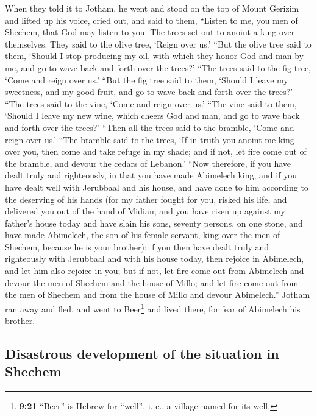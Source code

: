  When they told it to Jotham, he went and stood on the top
of Mount Gerizim and lifted up his voice, cried out, and said to them,
``Listen to me, you men of Shechem, that God may listen to you.
 The trees set out to anoint a king over themselves. They
said to the olive tree, `Reign over us.'  ``But the olive
tree said to them, `Should I stop producing my oil, with which they
honor God and man by me, and go to wave back and forth over the trees?'
 ``The trees said to the fig tree, `Come and reign over
us.'  ``But the fig tree said to them, `Should I leave my
sweetness, and my good fruit, and go to wave back and forth over the
trees?'  ``The trees said to the vine, `Come and reign
over us.'  ``The vine said to them, `Should I leave my
new wine, which cheers God and man, and go to wave back and forth over
the trees?'  ``Then all the trees said to the bramble,
`Come and reign over us.'  ``The bramble said to the
trees, `If in truth you anoint me king over you, then come and take
refuge in my shade; and if not, let fire come out of the bramble, and
devour the cedars of Lebanon.'  ``Now therefore, if you
have dealt truly and righteously, in that you have made Abimelech king,
and if you have dealt well with Jerubbaal and his house, and have done
to him according to the deserving of his hands  (for my
father fought for you, risked his life, and delivered you out of the
hand of Midian;  and you have risen up against my
father's house today and have slain his sons, seventy persons, on one
stone, and have made Abimelech, the son of his female servant, king over
the men of Shechem, because he is your brother);  if you
then have dealt truly and righteously with Jerubbaal and with his house
today, then rejoice in Abimelech, and let him also rejoice in you;
 but if not, let fire come out from Abimelech and devour
the men of Shechem and the house of Millo; and let fire come out from
the men of Shechem and from the house of Millo and devour Abimelech.''
 Jotham ran away and fled, and went to Beer\footnote{\textbf{9:21}
  ``Beer'' is Hebrew for ``well'', i. e., a village named for its well.}
and lived there, for fear of Abimelech his brother.

\hypertarget{disastrous-development-of-the-situation-in-shechem}{%
\subsection{Disastrous development of the situation in
Shechem}\label{disastrous-development-of-the-situation-in-shechem}}

